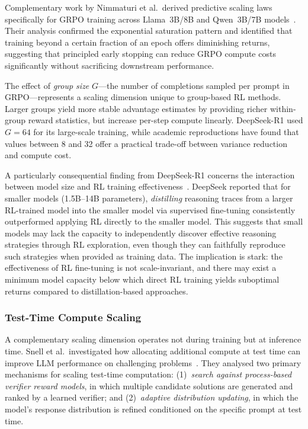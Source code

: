 Complementary work by Nimmaturi et al.\ derived predictive scaling laws
specifically for GRPO training across Llama~3B/8B and Qwen~3B/7B
models~\cite{nimmaturi2025grposcaling}.  Their analysis confirmed the
exponential saturation pattern and identified that training beyond a certain
fraction of an epoch offers diminishing returns, suggesting that principled
early stopping can reduce GRPO compute costs significantly without sacrificing
downstream performance.

The effect of \emph{group size} $G$---the number of completions sampled per
prompt in GRPO---represents a scaling dimension unique to group-based RL
methods.  Larger groups yield more stable advantage estimates by providing
richer within-group reward statistics, but increase per-step compute linearly.
DeepSeek-R1 used $G = 64$ for its large-scale training, while academic
reproductions have found that values between 8 and 32 offer a practical
trade-off between variance reduction and compute cost.

A particularly consequential finding from DeepSeek-R1 concerns the interaction
between model size and RL training
effectiveness~\cite{deepseek2025r1}.  DeepSeek reported that for smaller models
(1.5B--14B parameters), \emph{distilling} reasoning traces from a larger
RL-trained model into the smaller model via supervised fine-tuning consistently
outperformed applying RL directly to the smaller model.  This suggests that
small models may lack the capacity to independently discover effective reasoning
strategies through RL exploration, even though they can faithfully reproduce
such strategies when provided as training data.  The implication is stark: the
effectiveness of RL fine-tuning is not scale-invariant, and there may exist a
minimum model capacity below which direct RL training yields suboptimal
returns compared to distillation-based approaches.

\subsubsection{Test-Time Compute Scaling}

A complementary scaling dimension operates not during training but at inference
time.  Snell et al.\ investigated how allocating additional compute at test time
can improve LLM performance on challenging
problems~\cite{snell2024scaling}.  They analysed two primary mechanisms for
scaling test-time computation: (1)~\emph{search against process-based verifier
reward models}, in which multiple candidate solutions are generated and ranked
by a learned verifier; and (2)~\emph{adaptive distribution updating}, in which
the model's response distribution is refined conditioned on the specific prompt
at test time.

